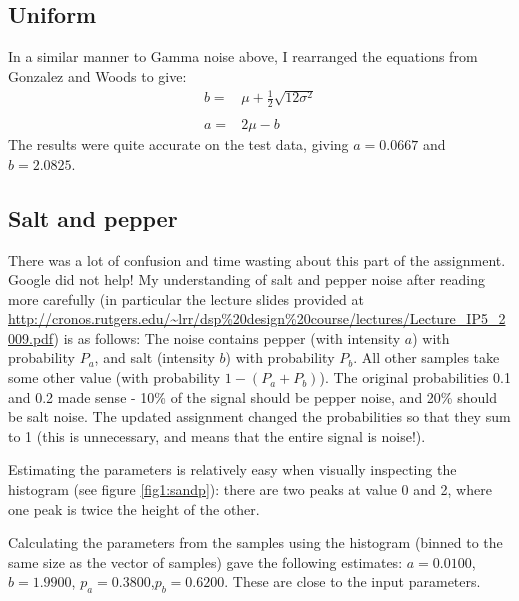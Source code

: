 \documentclass{article}
\begin{document}
\subsection*{Uniform}
In a similar manner to Gamma noise above, I rearranged the equations from Gonzalez and Woods to give:
\begin{equation}
\begin{array}{rl}
b = & \mu + \frac 1 2 {\sqrt{12\sigma ^2}}\\\\
a = & 2 \mu - b
\end{array}
\end{equation}
The results were quite accurate on the test data, giving $a=0.0667$ and $b=2.0825$.


\subsection*{Salt and pepper}
There was a lot of confusion and time wasting about this part of the assignment. Google did not help! 
My understanding of salt and pepper noise after reading more carefully (in particular the lecture slides provided at \url{http://cronos.rutgers.edu/~lrr/dsp\%20design\%20course/lectures/Lecture_IP5_2009.pdf}) is as follows:
The noise contains pepper (with intensity $a$)  with probability $P_a$, and salt (intensity $b$) with probability $P_b$. All other samples take some other value (with probability $1-(P_a + P_b)$). The original probabilities 0.1 and 0.2 made sense - 10\% of the signal should be pepper noise, and 20\% should be salt noise. The updated assignment changed the probabilities so that they sum to 1 (this is unnecessary, and means that the entire signal is noise!). 

Estimating the parameters is relatively easy when visually inspecting the histogram (see figure \ref{fig1:sandp}): there are two peaks at value 0 and 2, where one peak is twice the height of the other.

Calculating the parameters from the samples using the histogram (binned to the same size as the vector of samples) gave the following estimates:
$a = 0.0100$, $b = 1.9900$, $p_a = 0.3800$,$p_b =  0.6200$. These are close to the input parameters.
\end{document}
